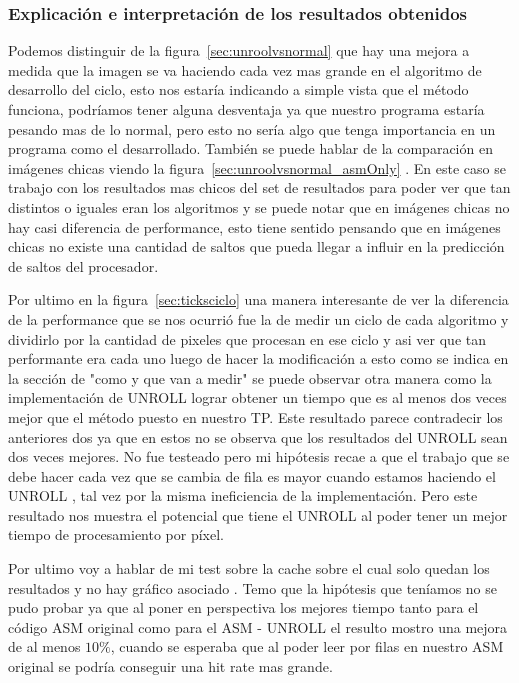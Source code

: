 \subsubsection*{Explicación e interpretación de los resultados obtenidos}
Podemos distinguir de la figura~\ref{sec:unroolvsnormal} que hay una mejora a medida que la imagen se va haciendo cada vez mas grande en el algoritmo de desarrollo del ciclo, esto nos estaría indicando a simple vista que el método funciona, podríamos tener alguna desventaja ya que nuestro programa estaría pesando mas de lo normal, pero esto no sería algo que tenga importancia en un programa como el desarrollado. También se puede hablar de la comparación en imágenes chicas viendo la figura~\ref{sec:unroolvsnormal_asmOnly} . En este caso se trabajo con los resultados mas chicos del set de resultados para poder ver que tan distintos o iguales eran los algoritmos y se puede notar que en imágenes chicas no hay casi diferencia de performance, esto tiene sentido pensando que en imágenes chicas no existe una cantidad de saltos que pueda llegar a influir en la predicción de saltos del procesador.

Por ultimo en la figura~\ref{sec:ticksciclo} una manera interesante de ver la diferencia de la performance que se nos ocurrió fue la de medir un ciclo de cada algoritmo y dividirlo por la cantidad de pixeles que procesan en ese ciclo y asi ver que tan performante era cada uno luego de hacer la modificación a esto como se indica en la sección de "como y que van a medir" se puede observar otra manera como la implementación de UNROLL lograr obtener un tiempo que es al menos dos veces mejor que el método puesto en nuestro TP. Este resultado parece contradecir los anteriores dos ya que en estos no se observa que los resultados del UNROLL sean dos veces mejores. No fue testeado pero mi hipótesis recae a que el trabajo que se debe hacer cada vez que se cambia de fila es mayor cuando estamos haciendo el UNROLL , tal vez por la misma ineficiencia de la implementación. Pero este resultado nos muestra el potencial que tiene el UNROLL al poder tener un mejor tiempo de procesamiento por píxel.

Por ultimo voy a hablar de mi test sobre la cache sobre el cual solo quedan los resultados y no hay gráfico asociado . Temo que la  hipótesis que teníamos no se pudo probar ya que al poner en perspectiva los mejores tiempo tanto para el código ASM original como para el ASM - UNROLL el resulto mostro una mejora de al menos $10\%$, cuando se esperaba que al poder leer por filas en nuestro ASM original se podría conseguir una hit rate mas grande. 

